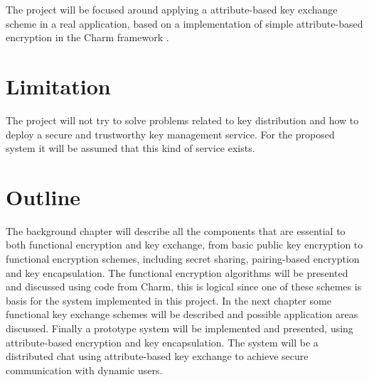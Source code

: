 The project will be focused around applying a attribute-based key exchange scheme in a real application, based on a implementation of simple attribute-based encryption in the Charm framework \cite{DBLP:Charm13}.


\section{Limitation}\label{sec:limitations}
The project will not try to solve problems related to key distribution and how to deploy a secure and trustworthy key management service. For the proposed system it will be assumed that this kind of service exists.

\section{Outline}\label{sec:outline}
The background chapter will describe all the components that are essential to both functional encryption and key exchange, from basic public key encryption to functional encryption schemes, including secret sharing, pairing-based encryption and key encapsulation. The functional encryption algorithms will be presented and discussed using code from Charm, this is logical since one of these schemes is basis for the system implemented in this project. In the next chapter some functional key exchange schemes will be described and possible application areas discussed. Finally a prototype system will be implemented and presented, using attribute-based encryption and key encapsulation. The system will be a distributed chat using attribute-based key exchange to achieve secure communication with dynamic users.
